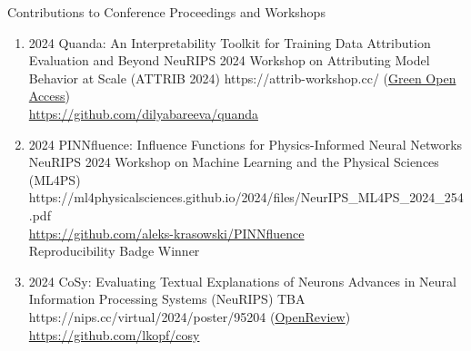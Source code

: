 \headedsubsection %
{Contributions to Conference Proceedings and Workshops}{}
{
    \begin{enumerate}
        
        \item {}
                    {2024}
                    {Quanda: An Interpretability Toolkit for Training Data Attribution Evaluation and Beyond}
                    {NeuRIPS 2024 Workshop on Attributing Model Behavior at Scale (ATTRIB 2024)}
                    {}
                    {https://attrib-workshop.cc/}
                    {(\href{https://arxiv.org/abs/2410.07158}{Green Open Access})\\
                    \href{https://github.com/dilyabareeva/quanda}{https://github.com/dilyabareeva/quanda}
                    }


        \item {}
                        {2024}
                        {PINNfluence: Influence Functions for Physics-Informed Neural Networks}
                        {NeuRIPS 2024 Workshop on Machine Learning and the Physical Sciences (ML4PS)}
                        {}
                        {https://ml4physicalsciences.github.io/2024/files/NeurIPS_ML4PS_2024_254.pdf}
                        {\\\href{https://github.com/aleks-krasowski/PINNfluence}{https://github.com/aleks-krasowski/PINNfluence}\\
                        Reproducibility Badge Winner}


        \item {}
                        {2024}
                        {CoSy: Evaluating Textual Explanations of Neurons}
                        {Advances in Neural Information Processing Systems (NeuRIPS)}
                        {TBA}
                        {https://nips.cc/virtual/2024/poster/95204}
                        {(\href{https://openreview.net/forum?id=2g84EvFlRt}{OpenReview})\\
                        \href{https://github.com/lkopf/cosy}{https://github.com/lkopf/cosy}
                        }



\end{enumerate}}
